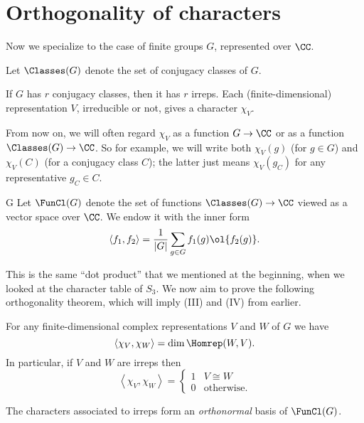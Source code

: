 \section{Orthogonality of characters}
Now we specialize to the case of finite groups $G$, represented over $\CC$.
\begin{definition}
	Let $\Classes(G)$ denote the set of conjugacy classes of $G$.
\end{definition}
If $G$ has $r$ conjugacy classes, then it has $r$ irreps.
Each (finite-dimensional) representation $V$, irreducible or not, gives a
character $\chi_V$.
\begin{abuse}
	From now on, we will often regard $\chi_V$ as a function $G \to \CC$
	or as a function $\Classes(G) \to \CC$.
	So for example, we will write both $\chi_V(g)$ (for $g \in G$)
	and $\chi_V(C)$ (for a conjugacy class $C$);
	the latter just means $\chi_V(g_C)$ for any representative $g_C \in C$.
\end{abuse}
\begin{definition}G
	Let $\FunCl(G)$ denote the set of functions $\Classes(G) \to \CC$
	viewed as a vector space over $\CC$.
	We endow it with the inner form
	\[
		\left< f_1, f_2 \right> =
		\frac{1}{|G|}
		\sum_{g \in G} f_1(g) \ol{f_2(g)}.
	\]
\end{definition}
This is the same ``dot product'' that we mentioned at the beginning,
when we looked at the character table of $S_3$.
We now aim to prove the following orthogonality theorem,
which will imply (III) and (IV) from earlier.
\begin{theorem}[Orthogonality]
	For any finite-dimensional complex representations $V$ and $W$
	of $G$ we have
	\[ \left< \chi_V, \chi_W \right> = \dim \Homrep(W, V). \]
	In particular, if $V$ and $W$ are irreps then
	\[ \left< \chi_V, \chi_W \right>
		=
		\begin{cases}
			1 & V  \cong W \\
			0 & \text{otherwise}.
		\end{cases}
	\]
\end{theorem}
\begin{corollary}
	The characters associated to irreps
	form an \emph{orthonormal} basis of $\FunCl(G)$.
\end{corollary}

